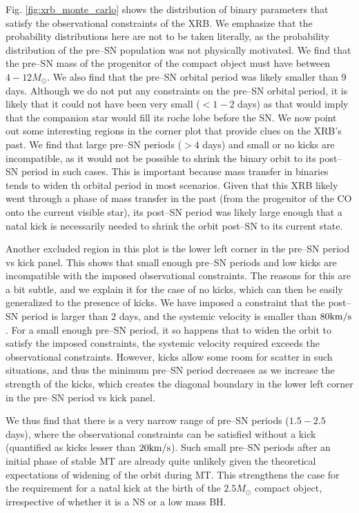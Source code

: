 \documentclass[linenumbers,trackchanges,twocolumn]{aastex701}
\begin{document}
Fig. \ref{fig:xrb_monte_carlo} shows the distribution of binary parameters that satisfy the observational constraints of the XRB. We emphasize that the probability distributions here are not to be taken literally, as the probability distribution of the pre--SN population was not physically motivated. We find that the pre--SN mass of the progenitor of the compact object must have between $4-12M_{\odot}$. We also find that the pre--SN orbital period was likely smaller than $9$ days. Although we do not put any constraints on the pre--SN orbital period, it is likely that it could not have been very small ($<1-2$ days) as that would imply that the companion star would fill its roche lobe before the SN. We now point out some interesting regions in the corner plot that provide clues on the XRB's past. We find that large pre--SN periods ($>4$ days) and small or no kicks are incompatible, as it would not be possible to shrink the binary orbit to its post--SN period in such cases. This is important because mass transfer in binaries tends to widen th orbital period in most scenarios. Given that this XRB likely went through a phase of mass transfer in the past (from the progenitor of the CO onto the current visible star), its post--SN period was likely large enough that a natal kick is necessarily needed to shrink the orbit post--SN to its current state. 

Another excluded region in this plot is the lower left corner in the pre--SN period vs kick panel. This shows that small enough pre--SN periods and low kicks are incompatible with the imposed observational constraints. The reasons for this are a bit subtle, and we explain it for the case of no kicks, which can then be easily generalized to the presence of kicks. We have imposed a constraint that the post--SN period is larger than $2$ days, and the systemic velocity is smaller than $80\rm km/s$. For a small enough pre--SN period, it so happens that to widen the orbit to satisfy the imposed constraints, the systemic velocity required exceeds the observational constraints. However, kicks allow some room for scatter in such situations, and thus the minimum pre--SN period decreases as we increase the strength of the kicks, which creates the diagonal boundary in the lower left corner in the pre--SN period vs kick panel.

We thus find that there is a very narrow range of pre--SN periods ($1.5-2.5$ days), where the observational constraints can be satisfied without a kick (quantified as kicks lesser than $20 \rm km/s$). Such small pre--SN periods after an initial phase of stable MT are already quite unlikely given the theoretical expectations of widening of the orbit during MT. This strengthens the case for the requirement for a natal kick at the birth of the $2.5 M_{\odot}$ compact object, irrespective of whether it is a NS or a low mass BH. 
\end{document}
